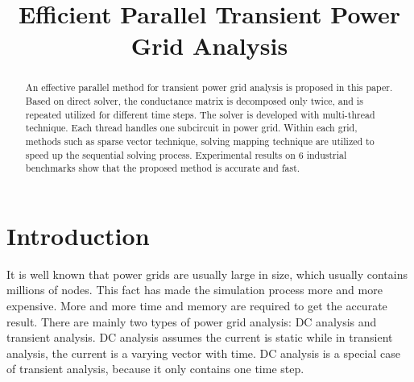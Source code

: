 \documentclass[conference]{IEEEtran}
\begin{document}
\title{Efficient Parallel Transient Power Grid Analysis}
\maketitle

\begin{abstract}
An effective parallel method for transient power grid analysis is proposed in this paper. Based on direct solver, the conductance matrix 
is decomposed only twice, and is repeated utilized for different time steps. The solver is developed with multi-thread technique.
Each thread handles one subcircuit in power grid. Within each grid, methods such as sparse vector technique, solving mapping technique
are utilized to speed up the sequential solving process. Experimental results on 6 industrial benchmarks show that the proposed method
is accurate and fast.
\end{abstract}

\section{Introduction}
It is well known that power grids are usually large in size, which usually contains millions of nodes. This fact has made the simulation 
process more and more expensive. More and more time and memory are required to get the accurate result. There are mainly two types of
power grid analysis: DC analysis and transient analysis. DC analysis assumes the current is static while in transient analysis, the 
current is a varying vector with time. DC analysis is a special case of transient analysis, because it only contains one time step.
\end{document}
